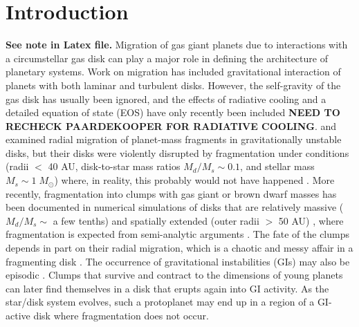 \documentclass[12pt,manuscript,authoryear]{aastex}
\begin{document}

\label{firstpage}

\section{Introduction}

{\bf See note in Latex file.} 
Migration of gas giant planets due to interactions with a circumstellar gas disk can play a major role in defining the architecture of planetary systems. Work on migration \citep[see review by][]{papaloizou2007} has included gravitational interaction of planets with both laminar and turbulent disks. However,  the self-gravity of the gas disk has usually been ignored, and the effects of radiative cooling and a detailed equation of state (EOS) have only recently been included \citep[e.g.,][]{paardekooper2006,paardekooper2010,paardekooper2010b}{\bf NEED TO RECHECK PAARDEKOOPER FOR RADIATIVE COOLING}. \citet{boss2005} and \citet{mayer2004} examined radial migration of planet-mass fragments in gravitationally unstable disks, but their disks were violently disrupted by fragmentation under conditions (radii $<$ 40 AU, disk-to-star mass ratios $M_d/M_s \sim 0.1$, and stellar mass $M_s \sim 1\;M_{\odot}$) where, in reality, this probably would not have happened  \citep{rafikov2005,rafikov2007,boley2006,boley2007b,boley2008,forgan2009,cai2010}. More recently, fragmentation into clumps with gas giant or brown dwarf masses has been documented in numerical simulations of disks that are relatively massive ($M_d/M_s \sim$ a few tenths) and spatially extended (outer radii $>$ 50 AU) \citep{krumholz2007,stamatellos2007,stamatellos2009,boley2009,boley2010}, where fragmentation is expected from semi-analytic arguments \citep[e.g.,][]{clarke2009,rafikov2009,dodson2009}. The fate of the clumps depends in part on their radial migration, which is a chaotic and messy affair in a fragmenting disk \citep[e.g.,][]{boley2009,boley2010,vorobyov2010,boleydurisen2010}. The occurrence of gravitational instabilities (GIs) may also be episodic \citep[e.g.,][]{vorobyov2006,vorobyov2010b,zhu2010}. Clumps that survive and contract to the dimensions of young planets can later find themselves in a disk that erupts again into GI activity. As the star/disk system evolves, such a protoplanet may end up in a region of a GI-active disk where fragmentation does not occur.
\end{document}
